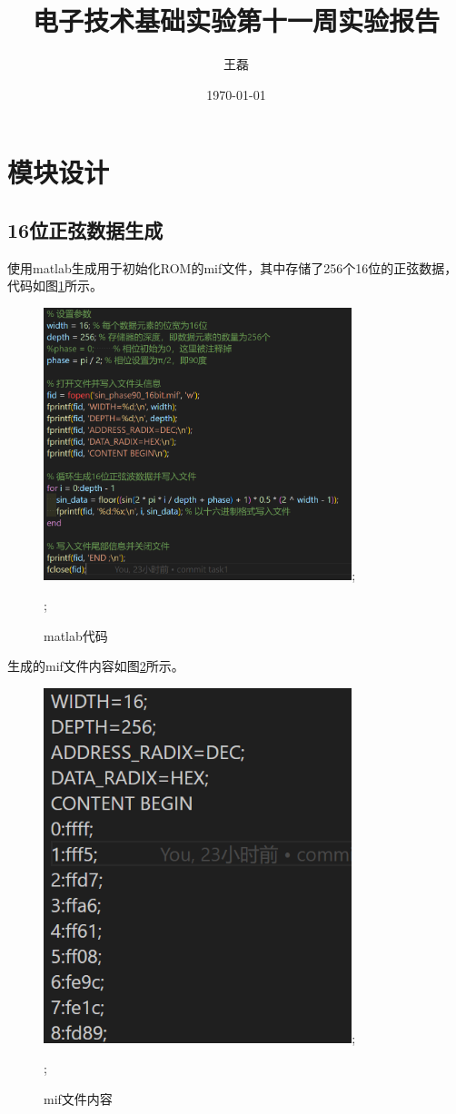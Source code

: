 \documentclass[UTF8]{ctexart}
\title{电子技术基础实验第十一周实验报告}
\author{王磊\quad2022012972}
\date{\today}
\begin{document}
\maketitle
\section{模块设计}
\subsection{16位正弦数据生成}
使用matlab生成用于初始化ROM的mif文件，其中存储了256个16位的正弦数据，代码如图\ref{fig:matlab_code}所示。
\begin{figure}[!ht]
    \centering
    \includegraphics[width=0.8\textwidth]{matlab_code.png};

    \caption{matlab代码}
    \label{fig:matlab_code};
\end{figure}

生成的mif文件内容如图\ref{fig:mif}所示。
\begin{figure}[!ht]
    \centering
    \includegraphics[width=0.8\textwidth]{mif.png};

    \caption{mif文件内容}
    \label{fig:mif};
\end{figure}
\end{document}
